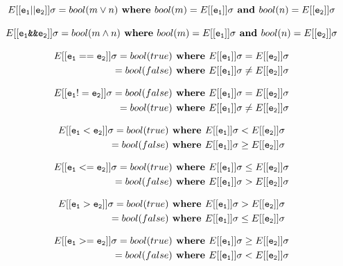 \documentclass[12pt]{article}
\begin{document}
$$E[[{\tt e_1 || e_2}]] \sigma = bool(m \lor n) \textbf{ 
where } bool(m) = E[[{\tt e_1}]] \sigma \textbf{ and } bool(n) = E[[{\tt e_2}]] \sigma$$

$$E[[{\tt e_1 \verb|&&| e_2}]] \sigma = bool(m \land n) \textbf{ where } bool(m) = E[[{\tt e_1}]] \sigma \textbf{ and } bool(n) = E[[{\tt e_2}]] \sigma$$

\begin{align*}
E[[{\tt e_1 == e_2}]] \sigma = bool(true) \textbf{ where } E[[{\tt e_1}]] \sigma = E[[{\tt e_2}]] \sigma \\
= bool(false) \textbf{ where } E[[{\tt e_1}]] \sigma \neq E[[{\tt e_2}]] \sigma \\
\end{align*}

\begin{align*}
E[[{\tt e_1 != e_2}]] \sigma = bool(false) \textbf{ where } E[[{\tt e_1}]] \sigma = E[[{\tt e_2}]] \sigma \\
= bool(true) \textbf{ where } E[[{\tt e_1}]] \sigma \neq E[[{\tt e_2}]] \sigma \\
\end{align*}

\begin{align*}
E[[{\tt e_1 < e_2}]] \sigma = bool(true) \textbf{ where } E[[{\tt e_1}]] \sigma < E[[{\tt e_2}]] \sigma \\
                     = bool(false) \textbf{ where }
E[[{\tt e_1}]] \sigma \geq E[[{\tt e_2}]] \sigma \\
\end{align*}

\begin{align*}
E[[{\tt e_1 <= e_2}]] \sigma = bool(true) \textbf{ where } E[[{\tt e_1}]] \sigma \leq E[[{\tt e_2}]] \sigma \\
                     = bool(false) \textbf{ where }
E[[{\tt e_1}]] \sigma > E[[{\tt e_2}]] \sigma \\
\end{align*}


\begin{align*}
E[[{\tt e_1 > e_2}]] \sigma = bool(true) \textbf{ where } E[[{\tt e_1}]] \sigma > E[[{\tt e_2}]] \sigma \\
                     = bool(false) \textbf{ where }
E[[{\tt e_1}]] \sigma \leq E[[{\tt e_2}]] \sigma \\
\end{align*}


\begin{align*}
E[[{\tt e_1 >= e_2}]] \sigma = bool(true) \textbf{ where } E[[{\tt e_1}]] \sigma \geq E[[{\tt e_2}]] \sigma \\
                     = bool(false) \textbf{ where }
E[[{\tt e_1}]] \sigma < E[[{\tt e_2}]] \sigma \\
\end{align*}
\end{document}
